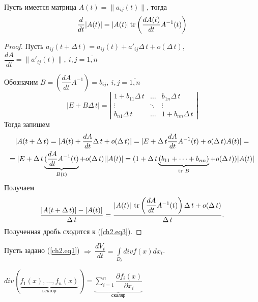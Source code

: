 \begin{lemma}\label{ch2.lem2}
Пусть имеется матрица $A(t)=\|a_{ij}(t)\|$, тогда 
\begin{equation}\label{ch2.eq3}
\dfrac{d}{dt}|A(t)|=|A(t)|\operatorname{tr}\left(\dfrac{dA(t)}{dt}A^{-1}(t)\right)
\end{equation}
\end{lemma}
\begin{proof}

Пусть $a_{ij}(t+\Delta\,t)=a_{ij}(t)+a'_{ij}\Delta\,t + o(\Delta\,t)$,
$\dfrac{dA}{dt}=\|a'_{ij}(t)\|,\ i,j=\overline{1,n}$

Обозначим $B=(\dfrac{dA}{dt}A^{-1})=b_{ij},\:i,j=\overline{1,n}$
$$
|E+B\Delta\,t|=
\left|
\begin{matrix}
1+b_{11}\Delta\,t & \dots & b_{1n}\Delta\,t\\
\vdots & \ddots &\vdots\\
b_{n1}\Delta\,t & \dots & 1+b_{nn}\Delta\,t
\end{matrix}
\right|
$$
Тогда запишем
\begin{multline*}
|A(t+\Delta\,t)=|A(t)+\dfrac{dA}{dt}\Delta\,t + o(\Delta\,t)|=|E+\Delta\,t\dfrac{dA}{dt}A^{-1}(t)+o(\Delta\,t)A(t)|=\\
=|E+\Delta\,t\underbrace{(\dfrac{dA}{dt}A^{-1}(t)}_{B(t)}+o(\Delta\,t)||A(t)| = (1+\Delta\,t\underbrace{(b_{11}+\dots+b_{nn})}_{\operatorname{tr}\:B}+o(\Delta\,t))|A(t)|
\end{multline*}
Получаем
$$
\dfrac{|A(t+\Delta\,t)|-|A(t)|}{\Delta\,t} = \dfrac{|A(t)|\:\operatorname{tr}\left(\dfrac{dA}{dt}A^{-1}(t)\right)\Delta\,t+o(\Delta\,t)}{\Delta\,t}.
$$
Полученная дробь сходится к (\ref{ch2.eq3}).
\end{proof}
\begin{theorem}[Лиувилля]
Пусть задано (\ref{ch2.eq1}) $\Rightarrow\ \dfrac{dV_t}{dt}=\displaystyle\int\limits_{D_t}^{}divf(x)dx_t$.

$div(\underbrace{f_1(x),\dots,f_n(x)}_{\textit{вектор}})=\underbrace{\sum\limits_{i=1}^{n}\dfrac{\partial f_i(x)}{\partial x_i}}_{\textit{скаляр}}$
\end{theorem}
